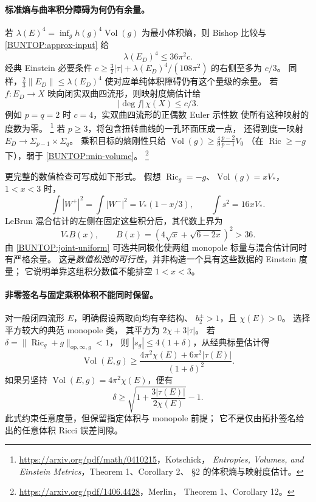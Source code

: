 \documentclass[UTF8,fontset=fandol,zihao=-4,oneside,openany]{ctexbook}
\theoremstyle{cjkplain}
\numberwithin{equation}{chapter}
\begin{document}
\paragraph{标准熵与曲率积分障碍为何仍有余量。}
若 \(\lambda(E)^4=\inf_g h(g)^4\operatorname{Vol}(g)\)
为最小体积熵，则 Bishop 比较与 \eqref{BUNTOP:approx-input} 给
\[
 \lambda(E_D)^4\le36\pi^2c.
\]
经典 Einstein 必要条件
\(c\ge\frac32|\tau|+\lambda(E_D)^4/(108\pi^2)\)
的右侧至多为 \(c/3\)。
同样，\(\frac23\|E_D\|\le\lambda(E_D)^4\)
使对应单纯体积障碍仍有这个量级的余量。
若 \(f:E_D\to X\) 映向闭实双曲四流形，则映射度熵估计给
\[
 |\deg f|\,\chi(X)\le c/3 .
\]
例如 \(p=q=2\) 时 \(c=4\)，实双曲四流形的正偶数 Euler 示性数
使所有这种映射的度数为零。%
\footnote{\url{https://arxiv.org/pdf/math/0410215}，Kotschick，
\emph{Entropies, Volumes, and Einstein Metrics}，Theorem 1、Corollary 2、
§2 的体积熵与映射度估计。}
若 \(p\ge3\)，将包含扭转曲线的一孔环面压成一点，
还得到度一映射
\(E_D\to\Sigma_{p-1}\times\Sigma_q\)。
乘积目标的熵刚性只给
\(\operatorname{Vol}(g)\ge\frac49\frac{p-2}{p-1}V_0\)
（在 \(\operatorname{Ric}\ge-g\) 下），弱于
\eqref{BUNTOP:min-volume}。%
\footnote{\url{https://arxiv.org/pdf/1406.4428}，Merlin，
Theorem 1、Corollary 12。}

更完整的数值检查可写成如下形式。
假想 \(\operatorname{Ric}_g=-g\)、\(\operatorname{Vol}(g)=xV_*\)，
\(1<x<3\) 时，
\[
 \int|W^+|^2=\int|W^-|^2=V_*(1-x/3),\qquad
 \int s^2=16xV_* .
\]
LeBrun 混合估计的左侧在固定这些积分后，其代数上界为
\[
 V_* B(x),\qquad B(x)=(4\sqrt x+\sqrt{6-2x})^2>36 .
\]
由 \eqref{BUNTOP:joint-uniform} 可选共同极化使两组 monopole
标量与混合估计同时有严格余量。
这是\emph{数值松弛的可行性}，并非构造一个具有这些数据的 Einstein 度量；
它说明单靠这组积分数值不能排空 \(1<x<3\)。

\paragraph{非零签名与固定乘积体积不能同时保留。}
对一般闭四流形 \(E\)，明确假设两取向均有辛结构、
\(b_2^\pm>1\)，且 \(\chi(E)>0\)。
选择平方较大的典范 monopole 类，
其平方为 \(2\chi+3|\tau|\)。
若 \(\delta=\|\operatorname{Ric}_g+g\|_{\mathrm{op},\infty,g}<1\)，
则 \(|s_g|\le4(1+\delta)\)，从经典标量估计得
\begin{equation}
 \operatorname{Vol}(E,g)
 \ge\frac{4\pi^2\chi(E)+6\pi^2|\tau(E)|}{(1+\delta)^2}.
 \label{BUNTOP:signature-volume}
\end{equation}
如果另坚持 \(\operatorname{Vol}(E,g)=4\pi^2\chi(E)\)，便有
\begin{equation}
 \delta\ge\sqrt{1+\frac{3|\tau(E)|}{2\chi(E)}}-1 .
 \label{BUNTOP:signature-gap-fixed-volume}
\end{equation}
此式约束任意度量，但保留指定体积与 monopole 前提；
它不是仅由拓扑签名给出的任意体积 Ricci 误差间隙。
\end{document}
